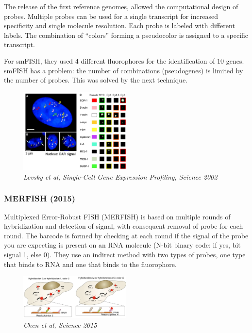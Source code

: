 The release of the first reference genomes, allowed the computational
design of probes. Multiple probes can be used for a single transcript
for increased specificity and single molecule resolution. Each probe is
labeled with different labels. The combination of ``colors'' forming a
pseudocolor is assigned to a specific transcript.

For smFISH, they used 4 different fluorophores for the identification of
10 genes. smFISH has a problem: the number of combinations (pseudogenes)
is limited by the number of probes. This was solved by the next
technique.

\begin{figure}
\centering
\includegraphics[width=0.5\textwidth]{images/Screenshot_5.png}
\caption{\emph{Levsky et al, Single-Cell Gene Expression Profiling,
Science 2002}}
\end{figure}

\hypertarget{merfish-2015}{%
\subsubsection{\texorpdfstring{\textbf{MERFISH
(2015)}}{MERFISH (2015)}}\label{merfish-2015}}

Multiplexed Error-Robust FISH (MERFISH) is based on multiple rounds of
hybridization and detection of signal, with consequent removal of probe
for each round. The barcode is formed by checking at each round if the
signal of the probe you are expecting is present on an RNA molecule
(N-bit binary code: if yes, bit signal 1, else 0). They use an indirect
method with two types of probes, one type that binds to RNA and one that
binds to the fluorophore.

\begin{figure}
\centering
\includegraphics[width=0.5\textwidth]{images/Screenshot_6.png}
\caption{\emph{Chen et al, Science 2015}}
\end{figure}

